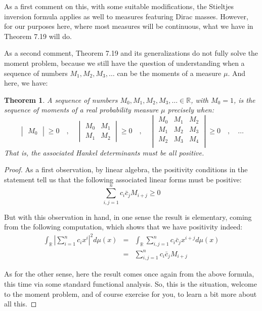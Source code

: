 \documentclass[12pt]{amsbook}
\newtheorem{theorem}{Theorem}[chapter]
\begin{document}
As a first comment on this, with some suitable modifications, the Stieltjes inversion formula applies as well to measures featuring Dirac masses. However, for our purposes here, where most measures will be continuous, what we have in Theorem 7.19 will do.

\bigskip

As a second comment, Theorem 7.19 and its generalizations do not fully solve the moment problem, because we still have the question of understanding when a sequence of numbers $M_1,M_2,M_3,\ldots$ can be the moments of a measure $\mu$. And here, we have:


\begin{theorem}
A sequence of numbers $M_0,M_1,M_2,M_3,\ldots\in\mathbb R$, with $M_0=1$, is the sequence of moments of a real probability measure $\mu$ precisely when:
$$\begin{vmatrix}M_0\end{vmatrix}\geq0\quad,\quad 
\begin{vmatrix}
M_0&M_1\\
M_1&M_2
\end{vmatrix}\geq0\quad,\quad 
\begin{vmatrix}
M_0&M_1&M_2\\
M_1&M_2&M_3\\
M_2&M_3&M_4\\
\end{vmatrix}\geq0\quad,\quad 
\ldots$$
That is, the associated Hankel determinants must be all positive.
\end{theorem}

\begin{proof}
As a first observation, by linear algebra, the positivity conditions in the statement tell us that the following associated linear forms must be positive:
$$\sum_{i,j=1}^nc_i\bar{c}_jM_{i+j}\geq0$$

But with this observation in hand, in one sense the result is elementary, coming from the following computation, which shows that we have positivity indeed:
\begin{eqnarray*}
\int_\mathbb R\left|\sum_{i=1}^nc_ix^i\right|^2d\mu(x)
&=&\int_\mathbb R\sum_{i,j=1}^nc_i\bar{c}_jx^{i+j}d\mu(x)\\
&=&\sum_{i,j=1}^nc_i\bar{c}_jM_{i+j}
\end{eqnarray*}

As for the other sense, here the result comes once again from the above formula, this time via some standard functional analysis. So, this is the situation, welcome to the moment problem, and of course exercise for you, to learn a bit more about all this.
\end{proof}
\end{document}
